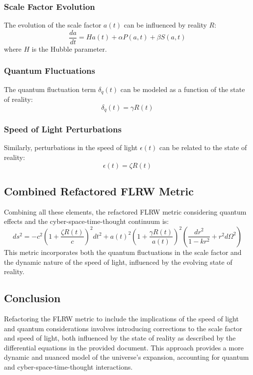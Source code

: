 \documentclass{article}
\begin{document}
\subsubsection*{Scale Factor Evolution}
The evolution of the scale factor $a(t)$ can be influenced by reality $R$:
\begin{equation}
\frac{da}{dt} = H a(t) + \alpha P(a, t) + \beta S(a, t)
\end{equation}
where $H$ is the Hubble parameter.

\subsubsection*{Quantum Fluctuations}
The quantum fluctuation term $\delta_q(t)$ can be modeled as a function of the state of reality:
\begin{equation}
\delta_q(t) = \gamma R(t)
\end{equation}

\subsubsection*{Speed of Light Perturbations}
Similarly, perturbations in the speed of light $\epsilon(t)$ can be related to the state of reality:
\begin{equation}
\epsilon(t) = \zeta R(t)
\end{equation}

\subsection*{Combined Refactored FLRW Metric}
Combining all these elements, the refactored FLRW metric considering quantum effects and the cyber-space-time-thought continuum is:
\begin{equation}
ds^2 = -c^2 \left( 1 + \frac{\zeta R(t)}{c} \right)^2 dt^2 + a(t)^2 \left( 1 + \frac{\gamma R(t)}{a(t)} \right)^2 \left( \frac{dr^2}{1 - kr^2} + r^2 d\Omega^2 \right)
\end{equation}
This metric incorporates both the quantum fluctuations in the scale factor and the dynamic nature of the speed of light, influenced by the evolving state of reality.

\subsection*{Conclusion}
Refactoring the FLRW metric to include the implications of the speed of light and quantum considerations involves introducing corrections to the scale factor and speed of light, both influenced by the state of reality as described by the differential equations in the provided document. This approach provides a more dynamic and nuanced model of the universe's expansion, accounting for quantum and cyber-space-time-thought interactions.
\end{document}

